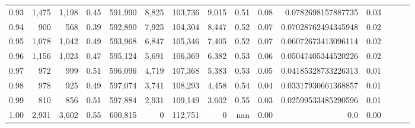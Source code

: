 \begin{tabular}{rrrrrrrrrrrrrrr}
0.93 &   1,475 &  1,198 &  0.45 &  591,990 &    8,825 &  103,736 &    9,015 &  0.51 &  0.08 &   0.0782698157887735 &      0.03 \\
0.94 &     900 &    568 &  0.39 &  592,890 &    7,925 &  104,304 &    8,447 &  0.52 &  0.07 &  0.07028762494345948 &      0.02 \\
0.95 &   1,078 &  1,042 &  0.49 &  593,968 &    6,847 &  105,346 &    7,405 &  0.52 &  0.07 &  0.06072673413096114 &      0.02 \\
0.96 &   1,156 &  1,023 &  0.47 &  595,124 &    5,691 &  106,369 &    6,382 &  0.53 &  0.06 &  0.05047405344520226 &      0.02 \\
0.97 &     972 &    999 &  0.51 &  596,096 &    4,719 &  107,368 &    5,383 &  0.53 &  0.05 &  0.04185328733226313 &      0.01 \\
0.98 &     978 &    925 &  0.49 &  597,074 &    3,741 &  108,293 &    4,458 &  0.54 &  0.04 &  0.03317930661368857 &      0.01 \\
0.99 &     810 &    856 &  0.51 &  597,884 &    2,931 &  109,149 &    3,602 &  0.55 &  0.03 &  0.02599533485290596 &      0.01 \\
1.00 &   2,931 &  3,602 &  0.55 &  600,815 &        0 &  112,751 &        0 &   nan &  0.00 &                  0.0 &      0.00 \\
\bottomrule
\end{tabular}
